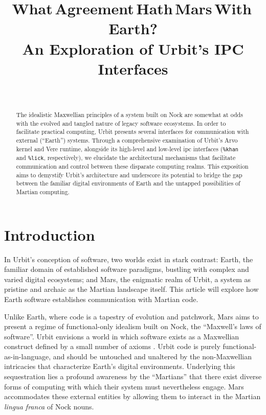 \documentclass[twoside]{article}
\title{What\,Agreement\,Hath\,Mars\,With\,Earth? \\ An Exploration of Urbit's IPC Interfaces}
\author{~\authorpatp \\ \affiliation}
\date{}
\begin{document}
\maketitle
\thispagestyle{firststyle}

\begin{abstract}
\noindent \sloppy
The idealistic Maxwellian principles of a system built on Nock are somewhat at odds with the evolved and tangled nature of legacy software ecosystems.  In order to facilitate practical computing, Urbit presents several interfaces for communication with external (“Earth”) systems.  Through a comprehensive examination of Urbit's Arvo kernel and Vere runtime, alongside its high-level and low-level {\sc ipc} interfaces (\texttt{\%khan} and \texttt{\%lick}, respectively), we elucidate the architectural mechanisms that facilitate communication and control between these disparate computing realms.  This exposition aims to demystify Urbit's architecture and underscore its potential to bridge the gap between the familiar digital environments of Earth and the untapped possibilities of Martian computing.
\end{abstract}

\setcounter{page}{83}

\tableofcontents

\section{Introduction}

In Urbit's conception of software, two worlds exist in stark contrast:  Earth, the familiar domain of established software paradigms, bustling with complex and varied digital ecosystems; 
and Mars, the enigmatic realm of Urbit, a system as pristine and archaic as the Martian landscape itself.  This article will explore how Earth software establishes communication with Martian code.

\sloppy
Unlike Earth, where code is a tapestry of evolution and patchwork, Mars aims to present a regime of functional-only idealism built on Nock, the ``Maxwell's laws of software''.  Urbit envisions a world in which software exists as a Maxwellian construct defined by a small number of axioms \citep{Nock4K}.  Urbit code is purely functional-as-in-language, and should be untouched and unaltered by the non-Maxwellian intricacies that characterize Earth’s digital environments.  Underlying this sequestration lies a profound awareness by the ``Martians'' that there exist diverse forms of computing with which their system must nevertheless engage.  Mars accommodates these external entities by allowing them to interact in the Martian \emph{lingua franca} of Nock nouns.
\end{document}
